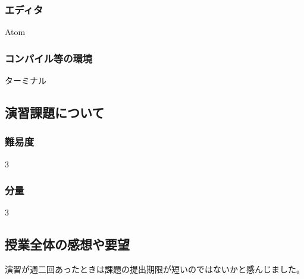\documentclass{jarticle}
\begin{document}
      \subsubsection{エディタ}
      Atom
      \subsubsection{コンパイル等の環境}
      ターミナル

    \subsection{演習課題について}
      \subsubsection{難易度}
      3
      \subsubsection{分量}
      3

    \subsection{授業全体の感想や要望}
    演習が週二回あったときは課題の提出期限が短いのではないかと感んじました。
\end{document}
